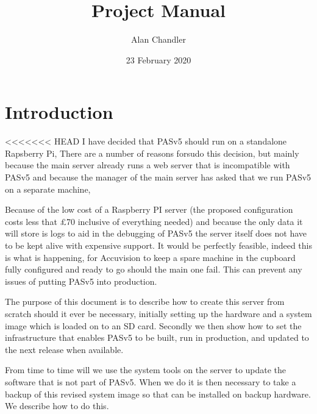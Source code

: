 \documentclass[Draft]{akc}
\author{Alan Chandler}
\title{Project Manual}
\date{23 February 2020}
\begin{document}
\maketitle
{}
\tableofcontents
\section{Introduction}

<<<<<<< HEAD
I have decided that PASv5 should run on a standalone Rapsberry Pi, There are a number of reasons forsudo
this decision, but mainly because the main server already runs a web server that is incompatible
with PASv5 and because the manager of the main server has asked that we run PASv5 on a separate
machine,

Because of the low cost of a Raspberry PI server (the proposed configuration costs less that £70
inclusive of everything needed) and because the only data it will store is logs to aid in the
debugging of PASv5 the server itself does not have to be kept alive with expensive support.  It
would be perfectly feasible, indeed this is what is happening, for Accuvision to keep a spare
machine in the cupboard fully configured and ready to go should the main one fail.  This can prevent
any issues of putting PASv5 into production.

The purpose of this document is to describe how to create this server from scratch should it ever be
necessary, initially setting up the hardware and a system image which is loaded on to an SD card.
Secondly we then show how to set the infrastructure that enables PASv5 to be built, run in
production, and updated to the next release when available.

From time to time will we use the system tools on the server to update the software that is not part
of PASv5. When we do it is then necessary to take a backup of this revised system image so that can
be installed on backup hardware.  We describe how to do this.
\end{document}
